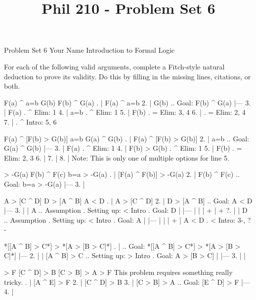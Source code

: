 
\title{Phil 210 - Problem Set 6}

\heading
Problem Set 6
Your Name
Introduction to Formal Logic
\endheading

For each of the following valid arguments, complete a Fitch-style natural deduction to prove its validity. Do this by filling in the missing lines, citations, or both.

\problems
{}
\argument
 F(a) ^ a=b
 G(b)
\argumentline
 F(b) ^ G(a)
\endargument
	\answer
	. | F(a) ^ a=b
         2. | G(b)         ..  Goal: F(b) ^ G(a)
            |---
	 3. | F(a)         .  ^ Elim: 1
	 4. | a=b          .  ^ Elim: 1
	 5. | F(b)         .  = Elim: 3, 4
	 6. |              .  = Elim: 2, 4
	 7. |              .  ^ Intro: 5, 6
	\endfitchproof
	\endanswer

\argument
 F(a) ^ [F(b) > G(b)]
 a=b
\argumentline
 G(a) ^ G(b)
\endargument
	\answer
	. | F(a) ^ [F(b) > G(b)]
	 2. | a=b          ..  Goal: G(a) ^ G(b)
	    |---
	 3. | F(a)         .  ^ Elim: 1
	 4. | F(b) > G(b)  .  ^ Elim: 1
	 5. | F(b)         .  = Elim: 2, 3
	 6. | 
	 7. | 
	 8. | 
	\endfitchproof
	\endanswer
Note: This is only one of multiple options for line 5.

\argument
 [F(a) ^ F(b)] > -G(a)
 F(b) ^ F(c)
\argumentline
 b=a > -G(a)
\endargument
	\answer
	. | [F(a) ^ F(b)] > -G(a)
	 2. | F(b) ^ F(c)    ..  Goal: b=a > -G(a)
	    |---
	 3. | 
	\endfitchproof
	\endanswer

\argument
 A > [C ^ D]
 D > [A ^ B]
\argumentline
 A < D
\endargument
	\answer
	. | A > [C ^ D]
	 2. | D > [A ^ B]  ..  Goal: A < D
	    |---
	 3. |   | A        ..  Assumption  .  Setting up: < Intro  .  Goal: D
	    |   |---
	    |   | 
	    |   +
	    |   +
	 ?. |   | D        ..  Assumption  .  Setting up: < Intro  .  Goal: A
	    |   |---
	    |   | 
	    |   +
	    | A < D        .  < Intro: 3-, ?-
	\endfitchproof
	\endanswer

\argument
\argumentline
 *[[A ^ B] > C*] > *[A > [B > C]*]
\endargument
	\answer
	. |                    ..  Goal: *[[A ^ B] > C*] > *[A > [B > C]*]
	    |---
	 2. |   | [A ^ B] > C    ..  Setting up: > Intro  .  Goal: A > [B > C]
	    |   |---
	 3. |   | 
	\endfitchproof
	\endanswer

\argument
 [A ^ E] > F
 [C ^ D] > B
 [C > B] > A
\argumentline
 [E ^ D] > F
\endargument
\Hint This problem requires something really tricky.
	\answer
	. | [A ^ E] > F
	 2. | [C ^ D] > B
	 3. | [C > B] > A  ..  Goal: [E ^ D] > F
	    |---
	 4. | 
	\endfitchproof
	\endanswer

\endproblems
\bye
